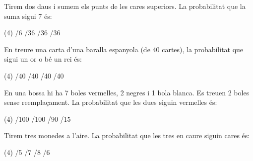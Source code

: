 \begin{autoaval}{51}
\begin{mylist}
\exer Tirem dos daus i sumem els punts de les cares superiors. La probabilitat que la suma sigui 7 és:
\begin{tasks}(4)
	/6  
	/36  
	/36  
	/36
\end{tasks}

 \exer En treure una carta d'una baralla espanyola (de 40 cartes), la probabilitat que sigui un or o bé un rei és:
\begin{tasks}(4)
	/40  
	/40  
	/40  
	/40
\end{tasks}

 \exer En una bossa hi ha 7 boles vermelles, 2 negres i 1 bola blanca. Es treuen 2 boles sense reemplaçament. La probabilitat que les dues siguin vermelles és:
\begin{tasks}(4)
	/100  
	/100  
	/90 
	/15
\end{tasks}

 \exer Tirem tres monedes a l'aire. La probabilitat que les tres en caure siguin cares és:
\begin{tasks}(4)
	/5 
	/7 
	/8  
	/6
\end{tasks}
\end{mylist}
\end{autoaval}

